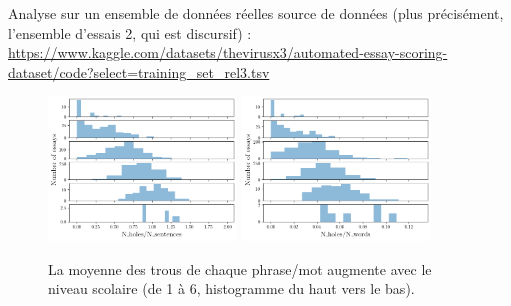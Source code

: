\documentclass{beamer}
\begin{document}
\begin{frame}{Analyse sur un ensemble de données réelles}
source de données (plus précisément, l'ensemble d'essais 2, qui est discursif) :
\fontsize{7pt}{8pt}\selectfont
\url{https://www.kaggle.com/datasets/thevirusx3/automated-essay-scoring-dataset/code?select=training_set_rel3.tsv}
\begin{figure}[H]
  \includegraphics[width=5cm]{gradesah1s.png}
  \includegraphics[width=5cm]{gradesah1w.png}
  \caption{La moyenne des trous de chaque phrase/mot augmente avec le niveau scolaire (de 1 à 6, histogramme du haut vers le bas).}
  \label{fig:ads}
\end{figure}

\end{frame}
\end{document}
